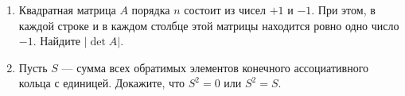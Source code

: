 \documentclass[11pt, a4paper]{article}
\begin{document}
\begin{enumerate}
\item Квадратная матрица $A$ порядка $n$ состоит из чисел $+1$ и $-1$. При этом, в каждой строке и в каждом столбце этой матрицы находится ровно одно число $-1$. Найдите $|\det A|$.

\item Пусть $S$ --- сумма всех обратимых элементов конечного ассоциативного кольца с единицей. Докажите, что $S^2=0$ или $S^2=S$.
\end{enumerate}
\end{document}
